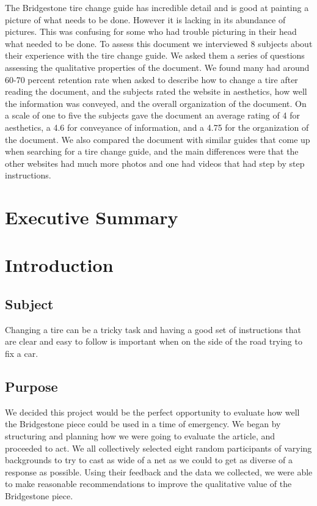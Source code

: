 \documentclass[12pt,A4paper]{article}
\begin{document}
	The Bridgestone tire change guide has incredible detail and is good at painting a picture of what needs to be done. However it is lacking in its abundance of pictures. This was confusing for some who had trouble picturing in their head what needed to be done. To assess this document we interviewed 8 subjects about their experience with the tire change guide. We asked them a series of questions assessing the qualitative properties of the document. We found many had around 60-70 percent retention rate when asked to describe how to change a tire after reading the document, and the subjects rated the website in aesthetics, how well the information was conveyed, and the overall organization of the document. On a scale of one to five the subjects gave the document an average rating of 4 for aesthetics, a 4.6 for conveyance of information, and a 4.75 for the organization of the document. We also compared the document with similar guides that come up when searching for a tire change guide, and the main differences were that the other websites had much more photos and one had videos that had step by step instructions.
	
	\clearpage
	
	\setcounter{page}{2}
	
	\tableofcontents

	
	\renewcommand\listfigurename{List of Illustrations}
	\listoffigures

	\clearpage
	\section{Executive Summary}

	\section{Introduction}
	
		\subsection{Subject}
		Changing a tire can be a tricky task and having a good set of instructions that are clear and easy to follow is important when on the side of the road trying to fix a car.

		\subsection{Purpose}
		We decided this project would be the perfect opportunity to evaluate how well the Bridgestone piece could be used in a time of emergency. We began by structuring and planning how we were going to evaluate the article, and proceeded to act. We all collectively selected eight random participants of varying backgrounds to try to cast as wide of a net as we could to get as diverse of a response as possible. Using their feedback and the data we collected, we were able to make reasonable recommendations to improve the qualitative value of the Bridgestone piece.
\end{document}
